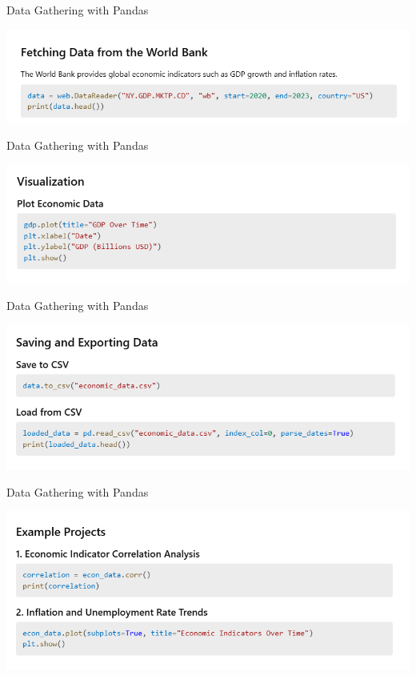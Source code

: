 \documentclass[11pt]{beamer}
\begin{document}
\begin{frame}{Data Gathering with Pandas}
	\begin{center}
	\includegraphics[scale=0.55]{../05-pictures/lesson-1-3_pic_6.png}
	\end{center}
\end{frame}
\begin{frame}{Data Gathering with Pandas}
	\begin{center}
	\includegraphics[scale=0.55]{../05-pictures/lesson-1-3_pic_7.png}
	\end{center}
\end{frame}
\begin{frame}{Data Gathering with Pandas}
	\begin{center}
	\includegraphics[scale=0.55]{../05-pictures/lesson-1-3_pic_8.png}
	\end{center}
\end{frame}
\begin{frame}{Data Gathering with Pandas}
	\begin{center}
	\includegraphics[scale=0.55]{../05-pictures/lesson-1-3_pic_9.png}
	\end{center}
\end{frame}
\end{document}
